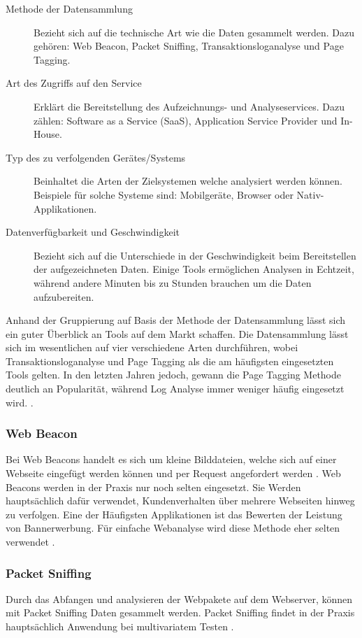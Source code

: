 \begin{description}
  \item[Methode der Datensammlung] Bezieht sich auf die technische Art wie die Daten gesammelt werden. Dazu gehören: Web Beacon, Packet Sniffing, Transaktionsloganalyse und Page Tagging.  
  \item[Art des Zugriffs auf den Service] Erklärt die Bereitstellung des Aufzeichnungs- und Analyseservices. Dazu zählen: Software as a Service (SaaS), Application Service Provider und In-House.
  \item[Typ des zu verfolgenden Gerätes/Systems] Beinhaltet die Arten der Zielsystemen welche analysiert werden können. Beispiele für solche Systeme sind: Mobilgeräte, Browser oder Nativ-Applikationen.
  \item[Datenverfügbarkeit und Geschwindigkeit] Bezieht sich auf die Unterschiede in der Geschwindigkeit beim Bereitstellen der aufgezeichneten Daten. Einige Tools ermöglichen Analysen in Echtzeit, während andere Minuten bis zu Stunden brauchen um die Daten aufzubereiten.
\end{description}

Anhand der Gruppierung auf Basis der Methode der Datensammlung lässt sich ein guter Überblick an Tools auf dem Markt schaffen. Die Datensammlung lässt sich im wesentlichen auf vier verschiedene Arten durchführen, wobei Transaktionsloganalyse und Page Tagging als die am häufigsten eingesetzten Tools gelten. In den letzten Jahren jedoch, gewann die Page Tagging Methode deutlich an Popularität, während Log Analyse immer weniger häufig eingesetzt wird. \parencite{nakatani2011toolselectionmethod}.

\subsubsection{Web Beacon} 
Bei Web Beacons handelt es sich um kleine Bilddateien, welche sich auf einer Webseite eingefügt werden können und per Request angefordert werden \parencite[S. 173]{nakatani2011toolselectionmethod}. Web Beacons werden in der Praxis nur noch selten eingesetzt. Sie Werden hauptsächlich dafür verwendet, Kundenverhalten über mehrere Webseiten hinweg zu verfolgen. Eine der Häufigsten Applikationen ist das Bewerten der Leistung von Bannerwerbung. Für einfache Webanalyse wird diese Methode eher selten verwendet \parencite[S. 3]{waisberg2009webShort}.

\subsubsection{Packet Sniffing}
Durch das Abfangen und analysieren der Webpakete auf dem Webserver, können mit Packet Sniffing Daten gesammelt werden. Packet Sniffing findet in der Praxis hauptsächlich Anwendung bei multivariatem Testen \parencite[S. 4]{waisberg2009webShort}.

